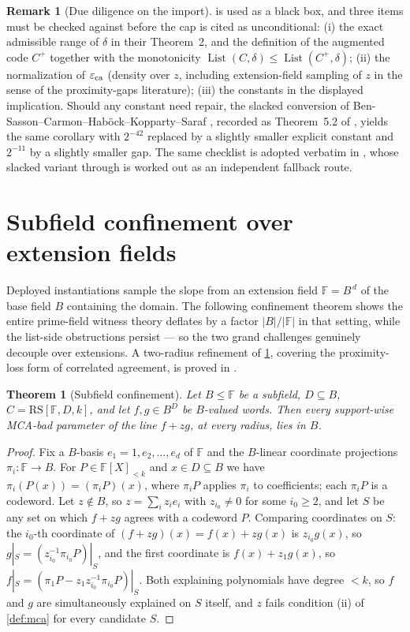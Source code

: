\documentclass[11pt]{article}
\newtheorem{theorem}{Theorem}[section]
\theoremstyle{definition}
\newtheorem{remark}[remark]{Remark}
\newcommand{\F}{\mathbb F}
\newcommand{\eps}{\varepsilon}
\newcommand{\RS}{\mathrm{RS}}
\newcommand{\eca}{\eps_{\rm ca}}
\newcommand{\Lst}{\operatorname{List}}
\begin{document}
\begin{remark}[Due diligence on the import]\label{rem:diligence}
 is used as a black box, and three items must be checked against \cite{CS25} before the cap is cited as unconditional: (i) the exact admissible range of $\delta$ in their Theorem~2, and the definition of the augmented code $C^+$ together with the monotonicity $\Lst(C,\delta)\le\Lst(C^+,\delta)$; (ii) the normalization of $\eca$ (density over $z$, including extension-field sampling of $z$ in the sense of the proximity-gaps literature); (iii) the constants in the displayed implication.  Should any constant need repair, the slacked conversion of Ben-Sasson--Carmon--Hab\"ock--Kopparty--Saraf \cite{BCHKS25}, recorded as Theorem~5.2 of \cite{ABF26}, yields the same corollary with $2^{-42}$ replaced by a slightly smaller explicit constant and $2^{-11}$ by a slightly smaller gap.  The same checklist is adopted verbatim in \cite{UniversalCap}, whose slacked variant through \cite{BCHKS25} is worked out as an independent fallback route.
\end{remark}

\section{Subfield confinement over extension fields}\label{sec:subfield}

Deployed instantiations sample the slope from an extension field $\F=B^{\,d}$ of the base field $B$ containing the domain.  The following confinement theorem shows the entire prime-field witness theory deflates by a factor $|B|/|\F|$ in that setting, while the list-side obstructions persist --- so the two grand challenges genuinely decouple over extensions.  A two-radius refinement of \cref{thm:subfield}, covering the proximity-loss form of correlated agreement, is proved in \cite[Lem.\ ``subfield confinement'']{UniversalCap}.

\begin{theorem}[Subfield confinement]\label{thm:subfield}
Let $B\le\F$ be a subfield, $D\subseteq B$, $C=\RS[\F,D,k]$, and let $f,g\in B^D$ be $B$-valued words.  Then every support-wise MCA-bad parameter of the line $f+zg$, at every radius, lies in $B$.
\end{theorem}

\begin{proof}
Fix a $B$-basis $e_1=1,e_2,\dots,e_d$ of $\F$ and the $B$-linear coordinate projections $\pi_i:\F\to B$.  For $P\in\F[X]_{<k}$ and $x\in D\subseteq B$ we have $\pi_i(P(x))=(\pi_iP)(x)$, where $\pi_iP$ applies $\pi_i$ to coefficients; each $\pi_iP$ is a codeword.  Let $z\notin B$, so $z=\sum_iz_ie_i$ with $z_{i_0}\ne0$ for some $i_0\ge2$, and let $S$ be any set on which $f+zg$ agrees with a codeword $P$.  Comparing coordinates on $S$: the $i_0$-th coordinate of $(f+zg)(x)=f(x)+zg(x)$ is $z_{i_0}g(x)$, so $g|_S=(z_{i_0}^{-1}\pi_{i_0}P)|_S$, and the first coordinate is $f(x)+z_1g(x)$, so $f|_S=(\pi_1P-z_1z_{i_0}^{-1}\pi_{i_0}P)|_S$.  Both explaining polynomials have degree $<k$, so $f$ and $g$ are simultaneously explained on $S$ itself, and $z$ fails condition (ii) of \cref{def:mca} for every candidate $S$.
\end{proof}
\end{document}
